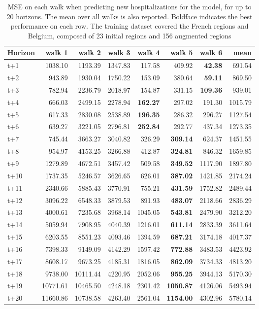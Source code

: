 \begin{table}[H]
\centering
\caption{MSE on each walk when predicting new hospitalizations for the model, for up to 20 horizons. The mean over all walks is also reported. Boldface indicates the best performance on each row. The training dataset covered the French regions and Belgium, composed of 23 initial regions and 156 augmented regions }
\label{tab:MSE_walk_encoder_decoder}
\begin{tabular}{lrrrrrrr}
\toprule
Horizon &   walk 1 &   walk 2 &  walk 3 &  walk 4 &  walk 5 &  walk 6 &    mean \\
\midrule
t+1  & 1038.10  & 1193.39  & 1347.83  & 117.58  & 409.92  & \textbf{42.38}  & 691.54  \\
t+2  & 943.89  & 1930.04  & 1750.22  & 153.09  & 380.64  & \textbf{59.11}  & 869.50  \\
t+3  & 782.94  & 2236.79  & 2018.97  & 154.87  & 331.15  & \textbf{109.36}  & 939.01  \\
t+4  & 666.03  & 2499.15  & 2278.94  & \textbf{162.27}  & 297.02  & 191.30  & 1015.79  \\
t+5  & 617.33  & 2830.08  & 2538.89  & \textbf{196.35}  & 286.32  & 296.27  & 1127.54  \\
t+6  & 639.27  & 3221.05  & 2796.81  & \textbf{252.84}  & 292.77  & 437.34  & 1273.35  \\
t+7  & 745.44  & 3663.27  & 3040.82  & 326.29  & \textbf{309.14}  & 624.37  & 1451.55  \\
t+8  & 954.97  & 4153.25  & 3266.88  & 412.87  & \textbf{324.81}  & 846.32  & 1659.85  \\
t+9  & 1279.89  & 4672.51  & 3457.42  & 509.58  & \textbf{349.52}  & 1117.90  & 1897.80  \\
t+10  & 1737.35  & 5246.57  & 3626.65  & 626.01  & \textbf{387.02}  & 1421.85  & 2174.24  \\
t+11  & 2340.66  & 5885.43  & 3770.91  & 755.21  & \textbf{431.59}  & 1752.82  & 2489.44  \\
t+12  & 3096.22  & 6548.33  & 3879.53  & 891.93  & \textbf{483.07}  & 2118.66  & 2836.29  \\
t+13  & 4000.61  & 7235.68  & 3968.14  & 1045.05  & \textbf{543.81}  & 2479.90  & 3212.20  \\
t+14  & 5059.94  & 7908.95  & 4040.39  & 1216.01  & \textbf{611.14}  & 2833.39  & 3611.64  \\
t+15  & 6203.55  & 8551.23  & 4093.46  & 1394.59  & \textbf{687.21}  & 3174.18  & 4017.37  \\
t+16  & 7398.33  & 9149.09  & 4142.29  & 1597.42  & \textbf{772.88}  & 3483.53  & 4423.92  \\
t+17  & 8608.17  & 9673.25  & 4185.31  & 1816.05  & \textbf{862.09}  & 3734.33  & 4813.20  \\
t+18  & 9738.00  & 10111.44  & 4220.95  & 2052.06  & \textbf{955.25}  & 3944.13  & 5170.30  \\
t+19  & 10771.61  & 10465.50  & 4248.18  & 2301.42  & \textbf{1050.87}  & 4126.06  & 5493.94  \\
t+20  & 11660.86  & 10738.58  & 4263.40  & 2561.04  & \textbf{1154.00}  & 4302.96  & 5780.14  \\


\end{tabular}
\end{table}
